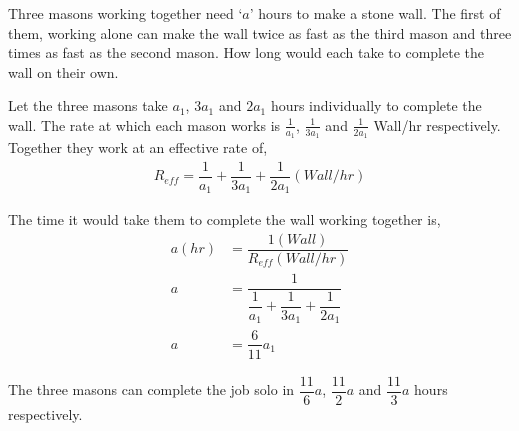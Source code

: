 

\question[3] Three masons working together need `$a$' hours to make a stone wall. The first of them, working alone can make the wall twice as fast as the third mason and three times as fast as the second mason. How long would each take to complete the wall on their own.


\ifprintanswers
\fi 

\begin{solution}[\halfpage]
  Let the three masons take $a_1$, $3a_1$ and $2a_1$ hours individually to complete the wall. The rate at which each mason works is $\frac{1}{a_1}$, $\frac{1}{3a_1}$ and $\frac{1}{2a_1}$ Wall/hr respectively. Together they work at an effective rate of,
  \begin{align}
	R_{eff} = \dfrac{1}{a_1} + \dfrac{1}{3a_1} + \dfrac{1}{2a_1} (Wall/hr)
  \end{align}
  
  The time it would take them to complete the wall working together is,
  \begin{align}
    a(hr) &= \dfrac{1(Wall)}{R_{eff}(Wall/hr)} \\
    a     &= \dfrac{1}{\dfrac{1}{a_1} + \dfrac{1}{3a_1} + \dfrac{1}{2a_1}} \\
    a     &= \dfrac{6}{11}a_1
  \end{align}
  
  The three masons can complete the job solo in $\dfrac{11}{6}a$, $\dfrac{11}{2}a$ and $\dfrac{11}{3}a$ hours respectively.
  
\end{solution}

